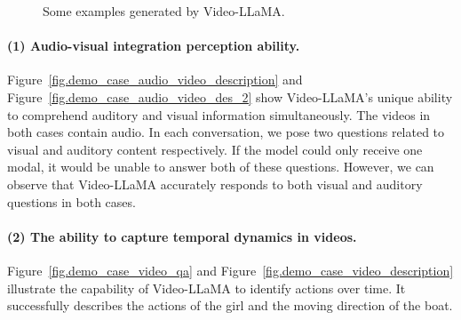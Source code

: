 \begin{figure*}[t]
    \centering
    \vspace{-0.5cm}
        \quad
        
        
    \quad
\caption{Some examples generated by Video-LLaMA. }
    \label{fig.demo_case}
    \vspace{-0.3cm}
\end{figure*}

\paragraph{(1) Audio-visual integration perception ability.} Figure~\ref{fig.demo_case_audio_video_description} and Figure~\ref{fig.demo_case_audio_video_des_2} show Video-LLaMA's unique ability to comprehend auditory and visual information simultaneously. The videos in both cases contain audio. In each conversation, we pose two questions related to visual and auditory content respectively.  If the model could only receive one modal, it would be unable to answer both of these questions. However, we can observe that Video-LLaMA accurately responds to both visual and auditory questions in both cases.

\paragraph{(2) The ability to capture temporal dynamics in videos.} 
Figure~\ref{fig.demo_case_video_qa} and Figure~\ref{fig.demo_case_video_description} illustrate the capability of Video-LLaMA to identify actions over time. 
It successfully describes the actions of the girl and the moving direction of the boat.

